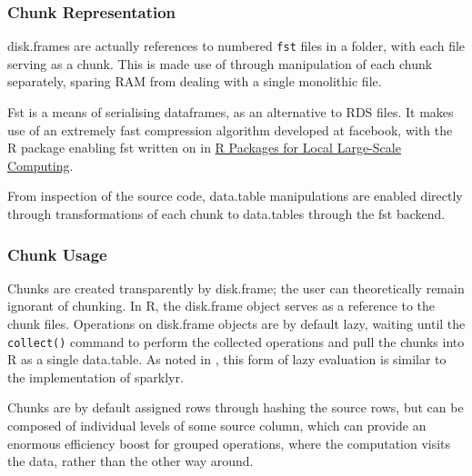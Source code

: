 \documentclass[a4paper,10pt]{article}
\begin{document}
\subsubsection{Chunk Representation}
\label{sec:chunk-representation}

disk.frames are actually references to numbered \texttt{fst} files in
a folder, with each file serving as a chunk. This is made use of
through manipulation of each chunk separately, sparing RAM from
dealing with a single monolithic file\cite{zj19:_inges_data}.

Fst is a means of serialising dataframes, as an alternative to RDS
files\cite{klik19}. It makes use of an extremely fast compression
algorithm developed at facebook, with the R package enabling fst
written on in \href{survey-r-packages-for-local-large-scale-computing.pdf}{R
	Packages for Local Large-Scale Computing}.

From inspection of the source code, data.table manipulations are
enabled directly through transformations of each chunk to data.tables
through the fst backend.

\subsubsection{Chunk Usage}
\label{sec:making-chunks}

Chunks are created transparently by disk.frame; the user can
theoretically remain ignorant of chunking. In R, the disk.frame object
serves as a reference to the chunk files. Operations on disk.frame
objects are by default lazy, waiting until the \texttt{collect()}
command to perform the collected operations and pull the chunks into R
as a single data.table. As noted in
\cite{zj19:_simpl_verbs_lazy_evaluat}, this form of lazy evaluation is
similar to the implementation of sparklyr.

Chunks are by default assigned rows through hashing the source rows,
but can be composed of individual levels of some source column, which
can provide an enormous efficiency boost for grouped operations, where
the computation visits the data, rather than the other way around.
\end{document}
